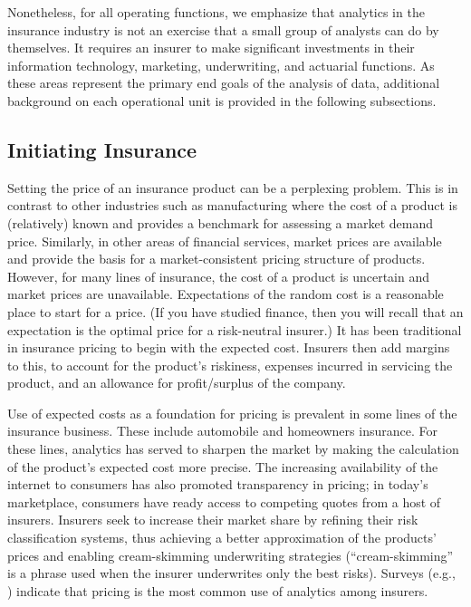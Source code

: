 \documentclass[
]{book}
\begin{document}
Nonetheless, for all operating functions, we emphasize that analytics in
the insurance industry is not an exercise that a small group of analysts
can do by themselves. It requires an insurer to make significant
investments in their information technology, marketing, underwriting,
and actuarial functions. As these areas represent the primary end goals
of the analysis of data, additional background on each operational unit
is provided in the following subsections.

\hypertarget{initiating-insurance}{%
\subsection{Initiating Insurance}\label{initiating-insurance}}

Setting the price of an insurance product can be a perplexing problem. This is in contrast to other industries such as manufacturing where the cost of a product is (relatively) known and provides a benchmark for assessing a market demand price. Similarly, in other areas of financial services, market prices are available and provide the basis
for a market-consistent pricing structure of products. However, for many lines of insurance, the cost of a product is uncertain and market prices are unavailable. Expectations of the random cost is a reasonable
place to start for a price. (If you have studied finance, then you will recall that an expectation is the optimal price for a risk-neutral insurer.) It has been traditional in insurance pricing to begin with the expected cost. Insurers then add margins to this, to account for the product's riskiness,
expenses incurred in servicing the product, and an allowance for profit/surplus of the company.

Use of expected costs as a foundation for pricing is prevalent in some lines of the insurance business. These include automobile and homeowners insurance. For these lines, analytics has served to sharpen the market by making the
calculation of the product's expected cost more precise. The increasing availability of the internet to consumers has also promoted transparency in pricing; in today's marketplace, consumers have ready access to competing quotes from a host of insurers. Insurers seek to increase their market share by refining their risk classification systems, thus achieving a better approximation of the products' prices and enabling cream-skimming underwriting strategies (``cream-skimming'' is a phrase used when the insurer underwrites only the best risks). Surveys (e.g., \citet{survey2013}) indicate that pricing is the most common use of analytics among insurers.
\end{document}
